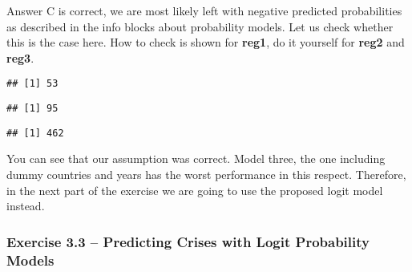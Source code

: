 \documentclass[a4paper,11pt,abstract=on]{scrartcl}
\newenvironment{Shaded}{\begin{snugshade}\small}{\end{snugshade}}
\newcommand{\KeywordTok}[1]{\textcolor[rgb]{0.13,0.29,0.53}{\textbf{{#1}}}}
\newcommand{\DecValTok}[1]{\textcolor[rgb]{0.00,0.00,0.81}{{#1}}}
\newcommand{\StringTok}[1]{\textcolor[rgb]{0.31,0.60,0.02}{{#1}}}
\newcommand{\CommentTok}[1]{\textcolor[rgb]{0.56,0.35,0.01}{\textit{{#1}}}}
\newcommand{\NormalTok}[1]{{#1}}
\newenvironment{infobox2}{}{}
\begin{document}
{\begin{infobox2}
Answer C is correct, we are most likely left with negative predicted
probabilities as described in the info blocks about probability models.
Let us check whether this is the case here. How to check is shown for
\textbf{reg1}, do it yourself for \textbf{reg2} and \textbf{reg3}.

\quad
\begin{minipage}{\textwidth}
\setlength{\parskip}{-1cm}
\begin{Shaded}
\end{Shaded}

{\small
\begin{verbatim}
## [1] 53
\end{verbatim}
}
\vskip -8pt \quad 
\begin{Shaded}
\end{Shaded}

{\small
\begin{verbatim}
## [1] 95
\end{verbatim}
}
\vskip -8pt \quad 
\begin{Shaded}
\end{Shaded}

{\small
\begin{verbatim}
## [1] 462
\end{verbatim}
}
\end{minipage}
\quad

You can see that our assumption was correct. Model three, the one
including dummy countries and years has the worst performance in this
respect. Therefore, in the next part of the exercise we are going to use
the proposed logit model instead.
\end{infobox2}

\subsubsection{\sf Exercise 3.3 -- Predicting Crises with Logit Probability Models}\label{exercise-3ux5f3-logit-probability-models-to-forecast-a-crisis}

}
\end{document}
